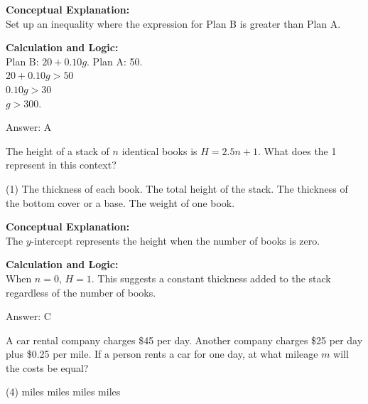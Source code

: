 \documentclass[11pt,paper=a4,answers]{exam}
\begin{document}
\begin{questions}
\begin{solution}
\textbf{Conceptual Explanation:} \\
Set up an inequality where the expression for Plan B is greater than Plan A.

\vspace{10pt}
\textbf{Calculation and Logic:} \\
Plan B: $20 + 0.10g$. Plan A: 50. \\
$20 + 0.10g > 50$ \\
$0.10g > 30$ \\
$g > 300$.

\vspace{15pt}
Answer: \colorbox{yellow!100}{A}
\end{solution}

\vspace{20pt}

\question
The height of a stack of $n$ identical books is $H = 2.5n + 1$. What does the 1 represent in this context?
\begin{tasks}(1)
    \task The thickness of each book.
    \task The total height of the stack.
    \task The thickness of the bottom cover or a base.
    \task The weight of one book.
\end{tasks}

\begin{solution}
\textbf{Conceptual Explanation:} \\
The $y$-intercept represents the height when the number of books is zero.

\vspace{10pt}
\textbf{Calculation and Logic:} \\
When $n=0$, $H=1$. This suggests a constant thickness added to the stack regardless of the number of books.

\vspace{15pt}
Answer: \colorbox{yellow!100}{C}
\end{solution}

\vspace{20pt}

\question
A car rental company charges \$45 per day. Another company charges \$25 per day plus \$0.25 per mile. If a person rents a car for one day, at what mileage $m$ will the costs be equal?
\begin{tasks}(4)
     miles
     miles
     miles
     miles
\end{tasks}


\end{questions}
\end{document}

